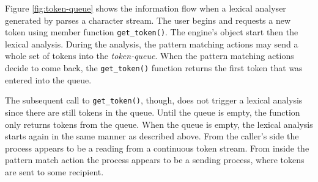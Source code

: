 Figure \ref{fig:token-queue} shows the information flow when a lexical
analyser generated by {\quex} parses a character stream.  The user begins and
requests a new token using member function {\tt get\_token()}.  The engine's
object start then the lexical analysis. During the analysis, the pattern
matching actions may send a whole set of tokens into the {\it token-queue}.
When the pattern matching actions decide to come back, the {\tt get\_token()}
function returns the first token that was entered into the queue.

The subsequent call to {\tt get\_token()}, though, does not trigger a lexical
analysis since there are still tokens in the queue. Until the queue is empty, 
the function only returns tokens from the queue. When the queue is empty,
the lexical analysis starts again in the same manner as described above. 
From the caller's side the process appears to be a reading from a continuous
token stream. From inside the pattern match action the process appears
to be a sending process, where tokens are sent to some recipient.


